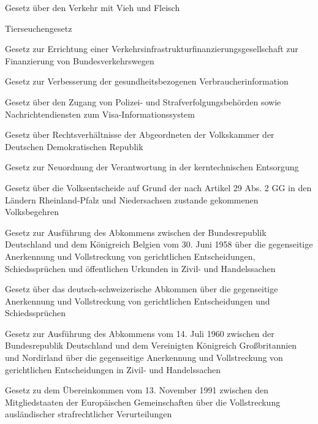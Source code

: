 \item[{ViehFlG}] Gesetz über den Verkehr mit Vieh und Fleisch

\item[{ViehSeuchG}] Tierseuchengesetz

\item[{VIFGG}] Gesetz zur Errichtung einer Verkehrsinfrastrukturfinanzierungsgesellschaft zur Finanzierung von Bundesverkehrswegen

\item[{VIG}] Gesetz zur Verbesserung der gesundheitsbezogenen Verbraucherinformation

\item[{VISZG}] Gesetz über den Zugang von Polizei- und Strafverfolgungsbehörden sowie Nachrichtendiensten zum Visa-Informationssystem

\item[{VKAbgG}] Gesetz über Rechtsverhältnisse der Abgeordneten der Volkskammer der Deutschen Demokratischen Republik

\item[{VkENOG}] Gesetz zur Neuordnung der Verantwortung in der kerntechnischen Entsorgung

\item[{VoEntschRP-NSG}] Gesetz über die Volksentscheide auf Grund der nach Artikel 29 Abs. 2 GG in den Ländern Rheinland-Pfalz und Niedersachsen zustande gekommenen Volksbegehren

\item[{VollstrAbkBELAG}] Gesetz zur Ausführung des Abkommens zwischen der Bundesrepublik Deutschland und dem Königreich Belgien vom 30. Juni 1958 über die gegenseitige Anerkennung und Vollstreckung von gerichtlichen Entscheidungen, Schiedssprüchen und öffentlichen Urkunden in Zivil- und Handelssachen

\item[{VollstrAbkCHEG}] Gesetz über das deutsch-schweizerische Abkommen über die gegenseitige Anerkennung und Vollstreckung von gerichtlichen Entscheidungen und Schiedssprüchen

\item[{VollstrAbkGBRAG}] Gesetz zur Ausführung des Abkommens vom 14. Juli 1960 zwischen der Bundesrepublik Deutschland und dem Vereinigten Königreich Großbritannien und Nordirland über die gegenseitige Anerkennung und Vollstreckung von gerichtlichen Entscheidungen in Zivil- und Handelssachen

\item[{VollstrAStrVEGÜbkG}] Gesetz zu dem Übereinkommen vom 13. November 1991 zwischen den Mitgliedstaaten der Europäischen Gemeinschaften über die Vollstreckung ausländischer strafrechtlicher Verurteilungen

